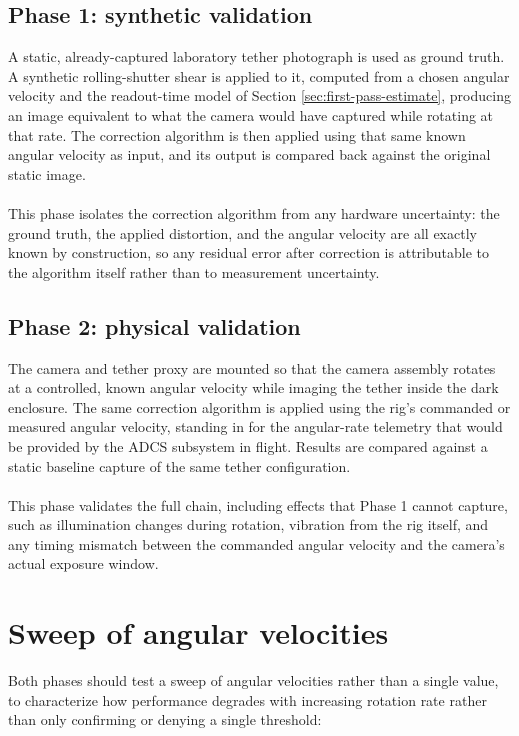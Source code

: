 \subsection{Phase 1: synthetic validation}

A static, already-captured laboratory tether photograph is used as ground truth. A synthetic rolling-shutter shear is applied to it, computed from a chosen angular velocity and the readout-time model of Section \ref{sec:first-pass-estimate}, producing an image equivalent to what the camera would have captured while rotating at that rate. The correction algorithm is then applied using that same known angular velocity as input, and its output is compared back against the original static image.
\\\\
This phase isolates the correction algorithm from any hardware uncertainty: the ground truth, the applied distortion, and the angular velocity are all exactly known by construction, so any residual error after correction is attributable to the algorithm itself rather than to measurement uncertainty.

\subsection{Phase 2: physical validation}

The camera and tether proxy are mounted so that the camera assembly rotates at a controlled, known angular velocity while imaging the tether inside the dark enclosure. The same correction algorithm is applied using the rig's commanded or measured angular velocity, standing in for the angular-rate telemetry that would be provided by the ADCS subsystem in flight. Results are compared against a static baseline capture of the same tether configuration.
\\\\
This phase validates the full chain, including effects that Phase 1 cannot capture, such as illumination changes during rotation, vibration from the rig itself, and any timing mismatch between the commanded angular velocity and the camera's actual exposure window.

\section{Sweep of angular velocities}

Both phases should test a sweep of angular velocities rather than a single value, to characterize how performance degrades with increasing rotation rate rather than only confirming or denying a single threshold:

